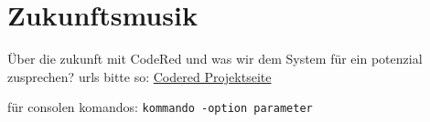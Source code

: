 \chapter{Zukunftsmusik}  %
\label{chapter:Zukunftsmusik}  %

Über die zukunft mit CodeRed und was wir dem System für ein potenzial zusprechen?
urls bitte so:
\href{http://codered.berlios.de}{Codered Projektseite}


für consolen komandos:
\verb|kommando -option parameter|


